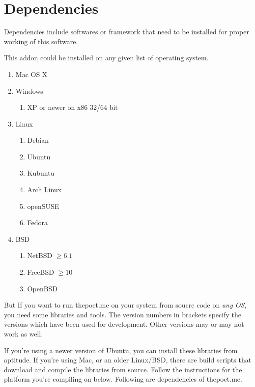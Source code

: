 \section{Dependencies}
Dependencies include softwares or framework that need to be installed for proper working of this software.

This addon could be installed on any given list of operating system.

\begin{enumerate}
	\item Mac OS X
	\item Windows
	 \begin{enumerate} 
	 	\item XP or newer on x86 32/64 bit
	 \end{enumerate}
	\item Linux
	\begin{enumerate} 
		\item Debian 
		\item Ubuntu 
		\item Kubuntu
		\item Arch Linux
		\item openSUSE
		\item Fedora
	 \end{enumerate}
	\item BSD
	\begin{enumerate}
		\item NetBSD  $\geq 6.1$
		\item FreeBSD $\geq 10 $
		\item OpenBSD
	\end{enumerate}
\end{enumerate}	 
 

But If you want to run thepoet.me on your system from soucre code on \emph{any OS}, you need some libraries and tools. The version
numbers in brackets specify the versions which have been used for
development. Other versions may or may not work as well.

If you're using a newer version of Ubuntu, you can install these 
libraries from aptitude. If you're using Mac, or an older Linux/BSD, there 
are build scripts that download and compile the libraries from source. 
Follow the instructions for the platform you're compiling on below. Following are
dependencies of thepoet.me.

